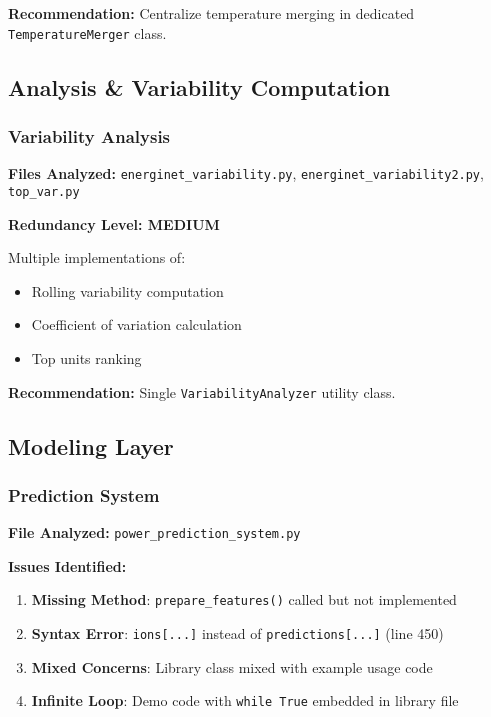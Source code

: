 \documentclass[11pt,a4paper]{article}
\begin{document}
\textbf{Recommendation:} Centralize temperature merging in dedicated \texttt{TemperatureMerger} class.

\subsection{Analysis \& Variability Computation}

\subsubsection{Variability Analysis}

\textbf{Files Analyzed:} \texttt{energinet\_variability.py}, \texttt{energinet\_variability2.py}, \texttt{top\_var.py}

\textbf{Redundancy Level: MEDIUM}

Multiple implementations of:
\begin{itemize}
    \item Rolling variability computation
    \item Coefficient of variation calculation
    \item Top units ranking
\end{itemize}

\textbf{Recommendation:} Single \texttt{VariabilityAnalyzer} utility class.

\subsection{Modeling Layer}

\subsubsection{Prediction System}

\textbf{File Analyzed:} \texttt{power\_prediction\_system.py}

\textbf{Issues Identified:}
\begin{enumerate}
    \item \textbf{Missing Method}: \texttt{prepare\_features()} called but not implemented
    \item \textbf{Syntax Error}: \texttt{ions[...]} instead of \texttt{predictions[...]} (line 450)
    \item \textbf{Mixed Concerns}: Library class mixed with example usage code
    \item \textbf{Infinite Loop}: Demo code with \texttt{while True} embedded in library file
\end{enumerate}
\end{document}
